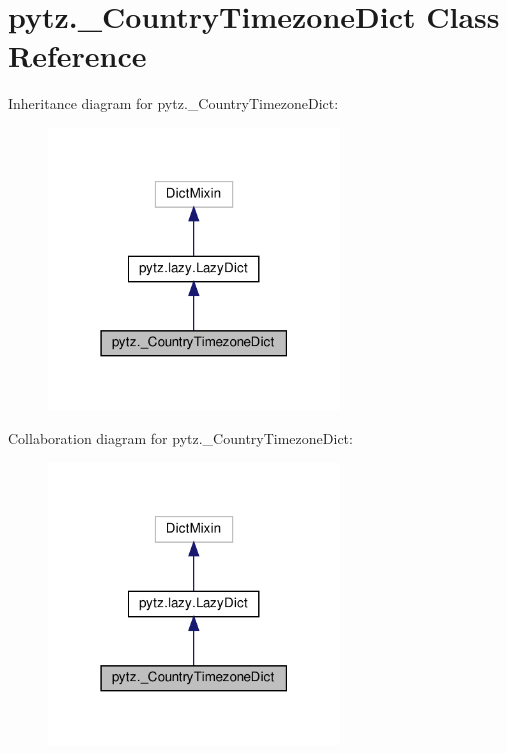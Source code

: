 \hypertarget{classpytz_1_1__CountryTimezoneDict}{}\section{pytz.\+\_\+\+Country\+Timezone\+Dict Class Reference}
\label{classpytz_1_1__CountryTimezoneDict}


Inheritance diagram for pytz.\+\_\+\+Country\+Timezone\+Dict\+:
\nopagebreak
\begin{figure}[H]
\begin{center}
\leavevmode
\includegraphics[width=219pt]{classpytz_1_1__CountryTimezoneDict__inherit__graph}
\end{center}
\end{figure}


Collaboration diagram for pytz.\+\_\+\+Country\+Timezone\+Dict\+:
\nopagebreak
\begin{figure}[H]
\begin{center}
\leavevmode
\includegraphics[width=219pt]{classpytz_1_1__CountryTimezoneDict__coll__graph}
\end{center}
\end{figure}
